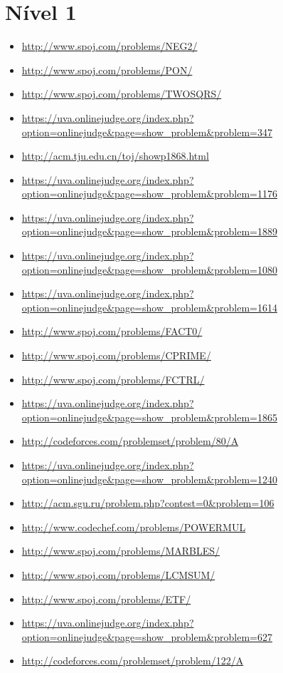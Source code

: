 \section{Nível 1}
\begin{itemize}
\item \url{http://www.spoj.com/problems/NEG2/}
\item \url{http://www.spoj.com/problems/PON/}
\item \url{http://www.spoj.com/problems/TWOSQRS/}
\item \url{https://uva.onlinejudge.org/index.php?option=onlinejudge&page=show_problem&problem=347}
\item \url{http://acm.tju.edu.cn/toj/showp1868.html}
\item \url{https://uva.onlinejudge.org/index.php?option=onlinejudge&page=show_problem&problem=1176}
\item \url{https://uva.onlinejudge.org/index.php?option=onlinejudge&page=show_problem&problem=1889}
\item \url{https://uva.onlinejudge.org/index.php?option=onlinejudge&page=show_problem&problem=1080}
\item \url{https://uva.onlinejudge.org/index.php?option=onlinejudge&page=show_problem&problem=1614}
\item \url{http://www.spoj.com/problems/FACT0/}
\item \url{http://www.spoj.com/problems/CPRIME/}
\item \url{http://www.spoj.com/problems/FCTRL/}
\item \url{https://uva.onlinejudge.org/index.php?option=onlinejudge&page=show_problem&problem=1865}
\item \url{http://codeforces.com/problemset/problem/80/A}
\item \url{https://uva.onlinejudge.org/index.php?option=onlinejudge&page=show_problem&problem=1240}
\item \url{http://acm.sgu.ru/problem.php?contest=0&problem=106}
\item \url{http://www.codechef.com/problems/POWERMUL}
\item \url{http://www.spoj.com/problems/MARBLES/}
\item \url{http://www.spoj.com/problems/LCMSUM/}
\item \url{http://www.spoj.com/problems/ETF/}
\item \url{https://uva.onlinejudge.org/index.php?option=onlinejudge&page=show_problem&problem=627}
\item \url{http://codeforces.com/problemset/problem/122/A}

\end{itemize}
